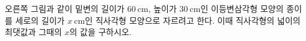 \noindent\begin{minipage}[t]{0.58\linewidth}\vspace{0pt}\raggedright 오른쪽 그림과 같이 밑변의 길이가 $60\ \mathrm{cm}$, 높이가 $30\ \mathrm{cm}$인 이등변삼각형 모양의 종이를 세로의 길이가 $x\ \mathrm{cm}$인 직사각형 모양으로 자르려고 한다. 이때 직사각형의 넓이의 최댓값과 그때의 $x$의 값을 구하시오.\end{minipage}\hfill\begin{minipage}[t]{0.4\linewidth}\vspace{0pt}\centering \resizebox{\ifdim\width>\linewidth\linewidth\else\width\fi}{!}{}\end{minipage}\par
